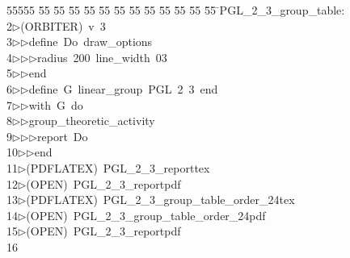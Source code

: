 %
%
\begin{tabbing}
55555 \= 55 \= 55 \= 55 \= 55 \= 55 \= 55 \= 55 \= 55 \= 55 \= 55 \= 55 \= 55 \= \>PGL\_2\_3\_group\_table:\\[0pt]
2\>$\triangleright$\>(ORBITER)\ v\ 3\ \\[0pt]
3\>$\triangleright$\>$\triangleright$\>define\ Do\ draw\_options\ \\[0pt]
4\>$\triangleright$\>$\triangleright$\>$\triangleright$\>radius\ 200\ line\_width\ 03\ \\[0pt]
5\>$\triangleright$\>$\triangleright$\>end\ \\[0pt]
6\>$\triangleright$\>$\triangleright$\>define\ G\ linear\_group\ PGL\ 2\ 3\ end\ \\[0pt]
7\>$\triangleright$\>$\triangleright$\>with\ G\ do\ \\[0pt]
8\>$\triangleright$\>$\triangleright$\>group\_theoretic\_activity\ \\[0pt]
9\>$\triangleright$\>$\triangleright$\>$\triangleright$\>report\ Do\ \\[0pt]
10\>$\triangleright$\>$\triangleright$\>end\\[0pt]
11\>$\triangleright$\>(PDFLATEX)\ PGL\_2\_3\_reporttex\\[0pt]
12\>$\triangleright$\>(OPEN)\ PGL\_2\_3\_reportpdf\\[0pt]
13\>$\triangleright$\>(PDFLATEX)\ PGL\_2\_3\_group\_table\_order\_24tex\\[0pt]
14\>$\triangleright$\>(OPEN)\ PGL\_2\_3\_group\_table\_order\_24pdf\\[0pt]
15\>$\triangleright$\>(OPEN)\ PGL\_2\_3\_reportpdf\\[0pt]
16\>\end{tabbing}
